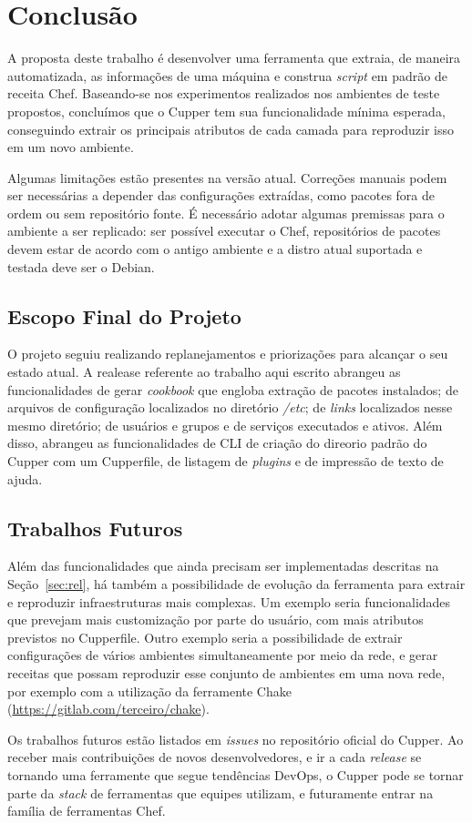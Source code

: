 \chapter{Conclusão}
\label{chap:conclusao}

A proposta deste trabalho é desenvolver uma ferramenta que extraia, de maneira
automatizada, as informações de uma máquina e construa \textit{script} em padrão
de receita Chef. Baseando-se nos experimentos realizados nos ambientes de teste propostos,
concluímos que o Cupper tem sua funcionalidade mínima esperada, conseguindo
extrair os principais atributos de cada camada para reproduzir isso em um novo ambiente.

Algumas limitações estão presentes na versão atual. Correções manuais podem ser necessárias
a depender das configurações extraídas, como pacotes fora de ordem ou sem repositório fonte.
É necessário adotar algumas premissas para o ambiente a ser replicado: ser possível executar
o Chef, repositórios de pacotes devem estar de acordo com o antigo ambiente e a distro atual
suportada e testada deve ser o Debian.

\section{Escopo Final do Projeto}

O projeto seguiu realizando replanejamentos e priorizações para alcançar o seu estado atual.
A realease referente ao trabalho aqui escrito abrangeu as funcionalidades de gerar 
\textit{cookbook} que engloba extração de pacotes instalados; de arquivos de configuração 
localizados no diretório \textit{/etc}; de \textit{links} localizados nesse mesmo diretório; 
de usuários e grupos e de serviços executados e ativos. Além disso, abrangeu as 
funcionalidades de CLI de criação do direorio padrão do Cupper com um Cupperfile, de listagem
de \textit{plugins} e de impressão de texto de ajuda.

\section{Trabalhos Futuros}

Além das funcionalidades que ainda precisam ser implementadas descritas na Seção~\ref{sec:rel},
há também a possibilidade de evolução da ferramenta para extrair e reproduzir
infraestruturas mais complexas. Um exemplo seria funcionalidades que
prevejam mais customização por parte do usuário, com mais atributos previstos no Cupperfile.
Outro exemplo seria a possibilidade de extrair configurações de vários ambientes simultaneamente
por meio da rede, e gerar receitas que possam reproduzir esse
conjunto de ambientes em uma nova rede, por exemplo com a utilização da ferramente Chake (\url{https://gitlab.com/terceiro/chake}).

Os trabalhos futuros estão listados em \textit{issues} no repositório oficial do Cupper.
Ao receber mais contribuições de novos desenvolvedores, e ir a cada \textit{release} se tornando
uma ferramente que segue tendências DevOps, o Cupper pode se tornar parte da \textit{stack} de ferramentas
que equipes utilizam, e futuramente entrar na família de ferramentas Chef.

